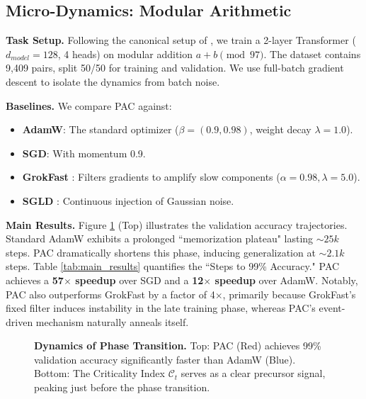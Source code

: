 \documentclass{article}
\theoremstyle{plain}
\theoremstyle{definition}
\theoremstyle{remark}
\newcommand{\C}{\mathcal{C}} %
\begin{document}
\subsection{Micro-Dynamics: Modular Arithmetic}
\label{subsec:modular}

\textbf{Task Setup.} Following the canonical setup of \citet{power2022grokking}, we train a 2-layer Transformer ($d_{model}=128$, 4 heads) on modular addition $a + b \pmod{97}$. The dataset contains 9,409 pairs, split 50/50 for training and validation. We use full-batch gradient descent to isolate the dynamics from batch noise.

\textbf{Baselines.} We compare PAC against:
\begin{itemize}
    \item \textbf{AdamW}: The standard optimizer ($\beta=(0.9, 0.98)$, weight decay $\lambda=1.0$).
    \item \textbf{SGD}: With momentum 0.9.
    \item \textbf{GrokFast} \cite{merrill2024grokfast}: Filters gradients to amplify slow components ($\alpha=0.98, \lambda=5.0$).
    \item \textbf{SGLD} \cite{welling2011bayesian}: Continuous injection of Gaussian noise.
\end{itemize}

\textbf{Main Results.} 
Figure \ref{fig:modular_dynamics} (Top) illustrates the validation accuracy trajectories. Standard AdamW exhibits a prolonged ``memorization plateau" lasting $\sim 25k$ steps. PAC dramatically shortens this phase, inducing generalization at $\sim 2.1k$ steps. 
Table \ref{tab:main_results} quantifies the ``Steps to 99\% Accuracy." PAC achieves a \textbf{57$\times$ speedup} over SGD and a \textbf{12$\times$ speedup} over AdamW. Notably, PAC also outperforms GrokFast by a factor of 4$\times$, primarily because GrokFast's fixed filter induces instability in the late training phase, whereas PAC's event-driven mechanism naturally anneals itself.

\begin{figure}[ht]
\vskip 0.2in
\begin{center}
\centerline{\fbox{\rule{0pt}{2.3in} \rule{0.9\columnwidth}{0pt}}} 
\caption{\textbf{Dynamics of Phase Transition.} Top: PAC (Red) achieves 99\% validation accuracy significantly faster than AdamW (Blue). Bottom: The Criticality Index $\C_t$ serves as a clear precursor signal, peaking just before the phase transition.}
\label{fig:modular_dynamics}
\end{center}
\vskip -0.2in
\end{figure}
\end{document}
